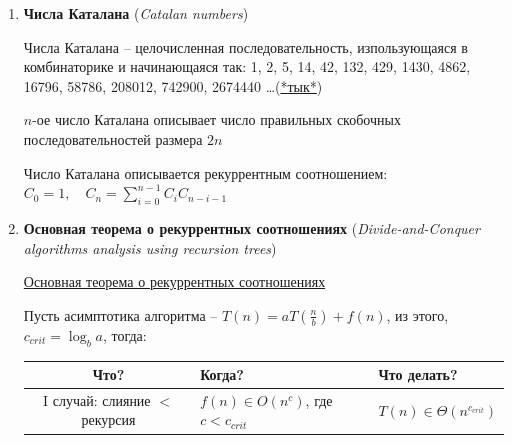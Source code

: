\documentclass[12pt]{article}
\begin{document}
\begin{enumerate}
        \vspace{3mm}

        \Exs $r(n) = 5r(n - 1), r(0) = 3$

        \begin{enumerate}
            \item $r(n + 1) - 5r(n) = 0 \quad (E - 5)r(n) = 0$

            \item $(E - 5)$ аннигилирует $r(n)$

            \item $(E - 5)$ уже разложен

            \item $r(n) = \alpha \cdot 5^n$

            \item $r(0) = 3 \Longrightarrow \alpha = 3$
        \end{enumerate}

        \item \textbf{Числа Каталана} (\textit{Catalan numbers})

        Числа Каталана -- целочисленная последовательность, изпользующаяся в комбинаторике и начинающаяся так: 1, 2, 5, 14, 42, 132, 429, 1430, 4862, 16796, 58786, 208012, 742900, 2674440 \dots (\href{https://oeis.org/A000108}{*тык*})

        $n$-ое число Каталана описывает число правильных скобочных последовательностей размера $2n$

        Число Каталана описывается рекуррентным соотношением: $C_0 = 1, \quad C_n = \sum_{i = 0}^{n - 1} C_{i} C_{n - i - 1}$

        \item \textbf{Основная теорема о рекуррентных соотношениях} (\textit{Divide-and-Conquer algorithms analysis using recursion trees})

        \hyperlink{mastertheorem}{Основная теорема о рекуррентных соотношениях}

        Пусть асимптотика алгоритма -- $T(n) = aT\left(\frac{n}{b}\right) + f(n)$, из этого, $c_{crit} = \log_b a$, тогда:

        \begin{tabular}{cll}
            \hline

            Что? & \hfil Когда? & \hfil Что делать? \\

            \hline

            I случай: слияние $<$ рекурсия & $f(n) \in O(n^c)$, где $c < c_{crit}$ & $T(n) \in \Theta(n^{c_{crit}})$ \\


\end{tabular}
\end{enumerate}
\end{document}
